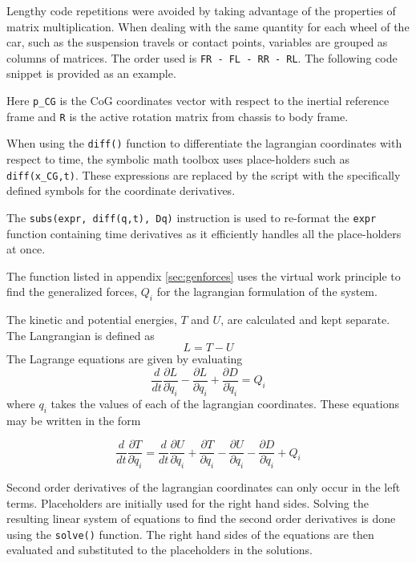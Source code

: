Lengthy code repetitions were avoided by taking advantage of the properties of matrix multiplication.
When dealing with the same quantity for each wheel of the car, such as the suspension travels or contact points, variables are grouped as columns of matrices. The order used is \texttt{FR - FL - RR - RL}. The following code snippet is provided as an example.



Here \texttt{p\_CG} is the CoG coordinates vector with respect to the inertial reference frame and \texttt{R} is the active rotation matrix from chassis to body frame.

When using the \texttt{diff()} function to differentiate the lagrangian coordinates with respect to time, the symbolic math toolbox uses place-holders such as \texttt{diff(x\_CG,t)}. These expressions are replaced by the script with the specifically defined symbols for the coordinate derivatives.

The \texttt{subs(expr, diff(q,t), Dq)} instruction is used to re-format the \texttt{expr} function containing time derivatives as it efficiently handles all the place-holders at once.

The function listed in appendix \ref{sec:genforces} uses the virtual work principle\cite{demeio} to find the generalized forces, $Q_i$ for the lagrangian formulation of the system.

The kinetic and potential energies, $T$ and $U$, are calculated and kept separate. The Langrangian is defined as
$$L = T - U$$
The Lagrange equations are given by evaluating
$$ \frac{d}{dt}\frac{\partial L}{\partial \dot q_i} - \frac{\partial L}{\partial q_i} + \frac{\partial D}{\partial \dot q_i}= Q_i$$
where $q_i$ takes the values of each of the lagrangian coordinates.
These equations may be written in the form

$$ \frac{d}{dt}\frac{\partial T}{\partial \dot q_i} = \frac{d}{dt}\frac{\partial U}{\partial \dot q_i} + \frac{\partial T}{\partial q_i} - \frac{\partial U}{\partial q_i} - \frac{\partial D}{\partial \dot q_i} + Q_i$$

Second order derivatives of the lagrangian coordinates can only occur in the left terms. Placeholders are initially used for the right hand sides.
Solving the resulting linear system of equations to find the second order derivatives is done using the \texttt{solve()} function. The right hand sides of the equations are then evaluated and substituted to the placeholders in the solutions.

